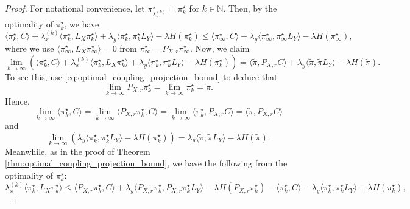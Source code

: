 \documentclass{article}
\theoremstyle{definition}
\newcommand{\N}{\mathbb{N}}
\begin{document}
\begin{proof}
    For notational convenience, let $\pi^\star_{\lambda_x^{(k)}} = \pi^\star_k$ for $k \in \N$. Then, by the optimality of $\pi^\star_k$, we have
    \begin{equation}
        \label{eq:optimality_limit}
        \langle \pi^\star_k, C \rangle + \lambda_x^{(k)} \langle \pi^\star_k, L_X \pi^\star_k \rangle + \lambda_y \langle \pi^\star_k, \pi^\star_k L_Y \rangle - \lambda H(\pi^\star_k) \le \langle \pi^\star_\infty, C \rangle + \lambda_y \langle \pi^\star_\infty, \pi^\star_\infty L_Y \rangle - \lambda H(\pi^\star_\infty),
    \end{equation}
    where we use $\langle \pi^\star_\infty, L_X \pi^\star_\infty \rangle = 0$ from $\pi^\star_\infty = P_{X, r} \pi^\star_\infty$. Now, we claim 
    \begin{equation}
        \label{eq:limit_objective}
        \lim_{k \to \infty} \left(\langle \pi^\star_k, C \rangle + \lambda_x^{(k)} \langle \pi^\star_k, L_X \pi^\star_k \rangle + \lambda_y \langle \pi^\star_k, \pi^\star_k L_Y \rangle - \lambda H(\pi^\star_k)\right) = \langle \tilde{\pi}, P_{X, r} C \rangle + \lambda_y \langle \tilde{\pi}, \tilde{\pi} L_Y \rangle - \lambda H(\tilde{\pi}).
    \end{equation}
    To see this, use \eqref{eq:optimal_coupling_projection_bound} to deduce that 
    \begin{equation*}
        \lim_{k \to \infty} P_{X, r} \pi^\star_k = \lim_{k \to \infty} \pi^\star_k = \tilde{\pi}.
    \end{equation*}
    Hence, 
    \begin{equation}
        \label{eq:limit_temp1}
        \lim_{k \to \infty} \langle \pi^\star_k, C \rangle = \lim_{k \to \infty} \langle P_{X, r} \pi^\star_k, C \rangle = \lim_{k \to \infty} \langle \pi^\star_k, P_{X, r} C \rangle = \langle \tilde{\pi}, P_{X, r} C \rangle
    \end{equation}
    and
    \begin{equation}
        \label{eq:limit_temp2}
        \lim_{k \to \infty} \left(\lambda_y \langle \pi^\star_k, \pi^\star_k L_Y \rangle - \lambda H(\pi^\star_k)\right) = \lambda_y \langle \tilde{\pi}, \tilde{\pi} L_Y \rangle - \lambda H(\tilde{\pi}).
    \end{equation}
    Meanwhile, as in the proof of Theorem \ref{thm:optimal_coupling_projection_bound}, we have the following from the optimality of $\pi^\star_k$:
    \begin{equation*}
        \lambda_x^{(k)} \langle \pi^\star_k, L_X \pi^\star_k \rangle \le \langle P_{X, r} \pi^\star_k, C \rangle + \lambda_y \langle P_{X, r} \pi^\star_k, P_{X, r} \pi^\star_k L_Y \rangle - \lambda H(P_{X, r} \pi^\star_k) - \langle \pi^\star_k, C \rangle - \lambda_y \langle \pi^\star_k, \pi^\star_k L_Y \rangle + \lambda H(\pi^\star_k),

\end{equation*}
\end{proof}
\end{document}

